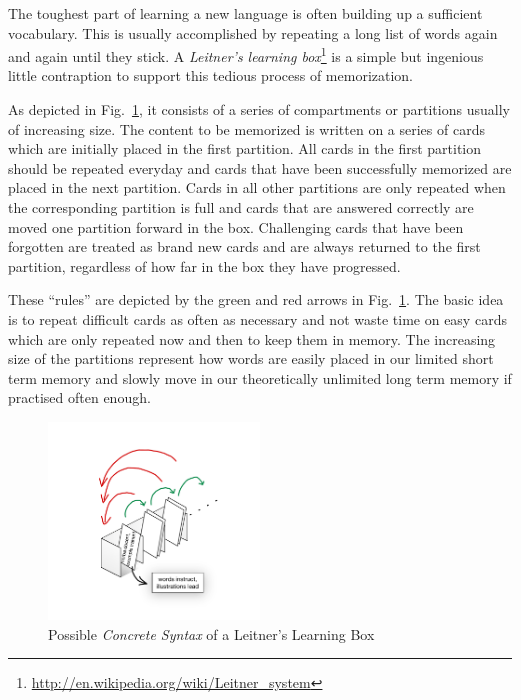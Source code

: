 \genHeader


The toughest part of learning a new language  is often building up a sufficient vocabulary. This is usually accomplished by repeating a long list of words again
and again until they stick. A \emph{Leitner's learning box}\footnote{\url{http://en.wikipedia.org/wiki/Leitner_system}} is a simple but ingenious little
contraption to support this tedious process of memorization.

As depicted in Fig.~\ref{fig:membox_illustration}, it consists of a series of compartments or partitions usually of increasing size. The content to be memorized
is written on a series of cards  which are initially placed in the first partition. All cards in the first  partition should be repeated everyday and cards that
have been successfully memorized are placed in the next partition. Cards in all other partitions are only repeated when the corresponding partition is full and
cards that are answered correctly are moved one partition forward in the box. Challenging cards that have been forgotten are treated as brand new cards and
are always returned to the first partition, regardless of how far in the box they have progressed.

These ``rules'' are depicted by the green and red arrows in Fig.~\ref{fig:membox_illustration}. The basic idea is to repeat difficult cards as often as
necessary and not waste time on easy cards which are only repeated now and then to keep them in memory. The increasing size of the partitions represent how
words are easily placed in our limited short term memory and slowly move in our theoretically unlimited long term memory if practised often enough.

 \begin{figure}[htp]
 \begin{center}
   \includegraphics[width=0.5\textwidth]{../membox_illustration}
   \caption[]{Possible \emph{Concrete Syntax} of a Leitner's Learning Box}
   \label{fig:membox_illustration}
 \end{center}
 \end{figure}
 \FloatBarrier


